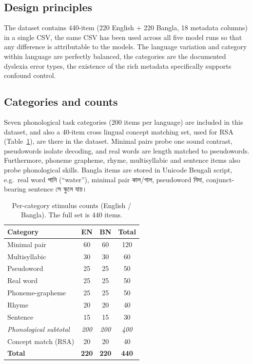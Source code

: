 \documentclass[preprint,12pt,authoryear]{elsarticle}
\newcommand{\bn}[1]{{\banglafont #1}}
\begin{document}
\subsection{Design principles}
The dataset contains 440-item (220 English + 220 Bangla, 18 metadata columns) in a single CSV, the same CSV has been used across all five model runs so that any difference is attributable to the models. The language variation and category within language are perfectly balanced, the categories are the documented dyslexia error types, the existence of the rich metadata specifically supports confound control.

\subsection{Categories and counts}
Seven phonological task categories (200 items per language) are included in this dataset, and also a 40-item cross lingual concept matching set, used for RSA (Table~\ref{tab:data}), are there in the dataset. Minimal pairs probe one sound contrast, pseudowords isolate decoding, and real words are length matched to pseudowords. Furthermore, phoneme grapheme, rhyme, multisyllabic and sentence items also probe phonological skills. Bangla items are stored in Unicode Bengali script, e.g.\ real word \bn{পানি} (``water''), minimal pair \bn{কাল}/\bn{গাল}, pseudoword \bn{নিদা}, conjunct-bearing sentence \bn{সে স্কুলে যায়।}

\begin{table}[H]
\caption{Per-category stimulus counts (English / Bangla). The full set is 440 items.}
\label{tab:data}
\centering
\small
\begin{tabular}{lccc}
\toprule
\textbf{Category} & \textbf{EN} & \textbf{BN} & \textbf{Total} \\
\midrule
Minimal pair        & 60 & 60 & 120 \\
Multisyllabic       & 30 & 30 & 60 \\
Pseudoword          & 25 & 25 & 50 \\
Real word           & 25 & 25 & 50 \\
Phoneme-grapheme    & 25 & 25 & 50 \\
Rhyme               & 20 & 20 & 40 \\
Sentence            & 15 & 15 & 30 \\
\textit{Phonological subtotal} & \textit{200} & \textit{200} & \textit{400} \\
Concept match (RSA) & 20 & 20 & 40 \\
\midrule
\textbf{Total}      & \textbf{220} & \textbf{220} & \textbf{440} \\
\bottomrule
\end{tabular}
\end{table}
\end{document}
